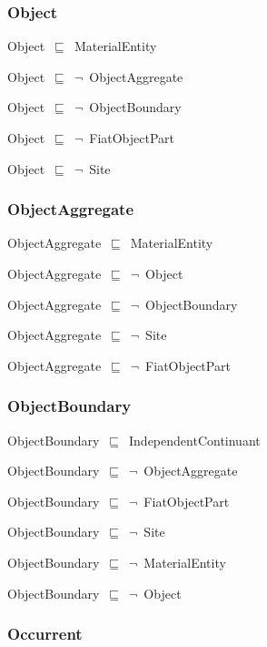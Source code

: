 \documentclass{article}
\begin{document}
\subsubsection*{Object}

Object~\ensuremath{\sqsubseteq}~MaterialEntity~

Object~\ensuremath{\sqsubseteq}~\ensuremath{\lnot}~ObjectAggregate

Object~\ensuremath{\sqsubseteq}~\ensuremath{\lnot}~ObjectBoundary

Object~\ensuremath{\sqsubseteq}~\ensuremath{\lnot}~FiatObjectPart

Object~\ensuremath{\sqsubseteq}~\ensuremath{\lnot}~Site

\subsubsection*{ObjectAggregate}

ObjectAggregate~\ensuremath{\sqsubseteq}~MaterialEntity~

ObjectAggregate~\ensuremath{\sqsubseteq}~\ensuremath{\lnot}~Object

ObjectAggregate~\ensuremath{\sqsubseteq}~\ensuremath{\lnot}~ObjectBoundary

ObjectAggregate~\ensuremath{\sqsubseteq}~\ensuremath{\lnot}~Site

ObjectAggregate~\ensuremath{\sqsubseteq}~\ensuremath{\lnot}~FiatObjectPart

\subsubsection*{ObjectBoundary}

ObjectBoundary~\ensuremath{\sqsubseteq}~IndependentContinuant~

ObjectBoundary~\ensuremath{\sqsubseteq}~\ensuremath{\lnot}~ObjectAggregate

ObjectBoundary~\ensuremath{\sqsubseteq}~\ensuremath{\lnot}~FiatObjectPart

ObjectBoundary~\ensuremath{\sqsubseteq}~\ensuremath{\lnot}~Site

ObjectBoundary~\ensuremath{\sqsubseteq}~\ensuremath{\lnot}~MaterialEntity

ObjectBoundary~\ensuremath{\sqsubseteq}~\ensuremath{\lnot}~Object

\subsubsection*{Occurrent}
\end{document}
